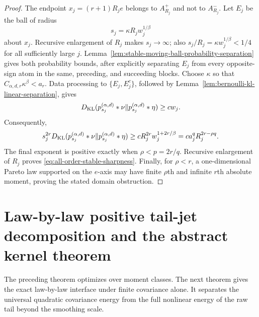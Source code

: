 \begin{proof}
The endpoint \(x_j=(r+1)R_je\) belongs to \(A_{R_j}^+\) and not to
\(A_{R_j}^-\).  Let \(E_j\) be the ball of radius
\[
 s_j=\kappa R_jw_j^{1/\beta}
\]
about \(x_j\).  Recursive enlargement of \(R_j\) makes \(s_j\to\infty\);
also \(s_j/R_j=\kappa w_j^{1/\beta}<1/4\) for all sufficiently large \(j\).
Lemma~\ref{lem:stable-moving-ball-probability-separation} gives both
probability bounds, after explicitly separating \(E_j\) from every
opposite-sign atom in the same, preceding, and succeeding blocks.
Choose \(\kappa\) so that
\(C_{\alpha,d,r}\kappa^\beta<a_r\).  Data processing to
\(\{E_j,E_j^c\}\), followed by
Lemma~\ref{lem:bernoulli-kl-linear-separation}, gives
\[
 D_{\rm KL}(p_{s_j}^{(\alpha,d)}*\nu\|
            p_{s_j}^{(\alpha,d)}*\eta)\ge c w_j.
\]
Consequently,
\[
 s_j^{2r}D_{\rm KL}(p_{s_j}^{(\alpha,d)}*\nu\|
                    p_{s_j}^{(\alpha,d)}*\eta)
 \ge cR_j^{2r}w_j^{1+2r/\beta}
 =ca_j^qR_j^{2r-\rho q}.
\]
The final exponent is positive exactly when \(\rho<p=2r/q\).
Recursive enlargement of \(R_j\) proves
\eqref{eq:all-order-stable-sharpness}.  Finally, for \(\rho<r\), a
one-dimensional Pareto law supported on the \(e\)-axis may have finite
\(\rho\)th and infinite \(r\)th absolute moment, proving the stated domain
obstruction.
\end{proof}



\section{Law-by-law positive tail-jet decomposition and the abstract kernel theorem}

The preceding theorem optimizes over moment classes.  The next theorem gives
the exact law-by-law interface under finite covariance alone.  It separates
the universal quadratic covariance energy from the full nonlinear energy of
the raw tail beyond the smoothing scale.

